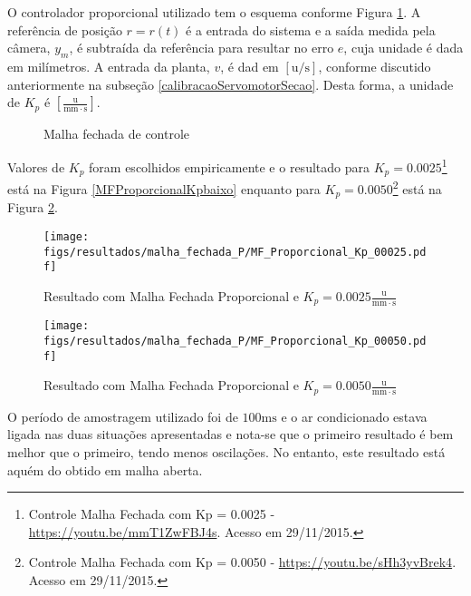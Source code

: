 O controlador proporcional utilizado tem o esquema conforme Figura \ref{mfechadaP}. A referência de posição $r = r(t)$ é a entrada do sistema e a saída medida pela câmera, $y_m$, é subtraída da referência para resultar no erro $e$, cuja unidade é dada em milímetros. A entrada da planta, $v$, é dad em $[\mathrm{u}/\mathrm{s}]$, conforme discutido anteriormente na subseção \ref{calibracaoServomotorSecao}. Desta forma, a unidade de $K_p$ é $\left[\frac{\mathrm{u}}{\mathrm{mm}\cdot\mathrm{s}}\right]$.

\begin{figure}[!ht]
\centering
{}
\caption{Malha fechada de controle\label{mfechadaP}}
\end{figure}

Valores de $K_p$ foram escolhidos empiricamente e o resultado para $K_p = 0.0025$\footnote{Controle Malha Fechada com Kp = 0.0025 - \url{https://youtu.be/mmT1ZwFBJ4s}. Acesso em 29/11/2015.} está na Figura \ref{MFProporcionalKpbaixo} enquanto para $K_p = 0.0050$\footnote{Controle Malha Fechada com Kp = 0.0050 - \url{https://youtu.be/sHh3yvBrek4}. Acesso em 29/11/2015.} está na Figura \ref{MFProporcionalKpmedio}.


\begin{figure}[!htb]
    \centering
    \begin{minipage}{.45\textwidth}
        \centering
        \texttt{[image: figs/resultados/malha\_fechada\_P/MF\_Proporcional\_Kp\_00025.pdf]}
        \caption{Resultado com Malha Fechada Proporcional e $K_p = 0.0025\frac{\mathrm{u}}{\mathrm{mm}\cdot\mathrm{s}}$}
        \label{MFProporcionalKpbaixo}
    \end{minipage}%
    \hspace{0.1cm}
    \begin{minipage}{0.45\textwidth}
        \centering
        \texttt{[image: figs/resultados/malha\_fechada\_P/MF\_Proporcional\_Kp\_00050.pdf]}
        \caption{Resultado com Malha Fechada Proporcional e $K_p = 0.0050\frac{\mathrm{u}}{\mathrm{mm}\cdot\mathrm{s}}$
        \label{MFProporcionalKpmedio}}
    \end{minipage}
\end{figure}

O período de amostragem utilizado foi de $100\mathrm{ms}$ e o ar condicionado estava ligada nas duas situações apresentadas e nota-se que o primeiro resultado é bem melhor que o primeiro, tendo menos oscilações. No entanto, este resultado está aquém do obtido em malha aberta.

